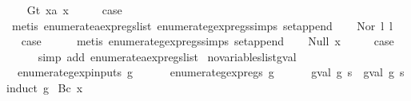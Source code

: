 \begin{isabellebody}
\isamarkupfalse%
\isanewline
\ \ \isamarkupfalse%
\ {\isacharparenleft}Gt\ x{}a\ x{}{\isacharparenright}\isanewline
\ \ \isamarkupfalse%
\ \isamarkupfalse%
\ {\isacharquery}case\isanewline
\ \ \ \ \isamarkupfalse%
\ {\isacharparenleft}metis\ enumerate{\isacharunderscore}aexp{\isacharunderscore}regs{\isacharunderscore}list\ enumerate{\isacharunderscore}gexp{\isacharunderscore}regs{\isachardot}simps{\isacharparenleft}{}{\isacharparenright}\ set{\isacharunderscore}append{\isacharparenright}\isanewline
{}\isamarkupfalse%
\isanewline
\ \ \isamarkupfalse%
\ {\isacharparenleft}Nor\ l{}\ l{}{\isacharparenright}\isanewline
\ \ \isamarkupfalse%
\ \isamarkupfalse%
\ {\isacharquery}case\isanewline
\ \ \ \ \isamarkupfalse%
\ {\isacharparenleft}metis\ enumerate{\isacharunderscore}gexp{\isacharunderscore}regs{\isachardot}simps{\isacharparenleft}{}{\isacharparenright}\ set{\isacharunderscore}append{\isacharparenright}\isanewline
{}\isamarkupfalse%
\isanewline
\ \ \isamarkupfalse%
\ {\isacharparenleft}Null\ x{\isacharparenright}\isanewline
\ \ \isamarkupfalse%
\ \isamarkupfalse%
\ {\isacharquery}case\isanewline
\ \ \ \ \isamarkupfalse%
\ {\isacharparenleft}simp\ add{\isacharcolon}\ enumerate{\isacharunderscore}aexp{\isacharunderscore}regs{\isacharunderscore}list{\isacharparenright}\isanewline
{}\isamarkupfalse%
%
\endisatagproof
{\isafoldproof}%
%
\isadelimproof
\isanewline
%
\endisadelimproof
\isanewline
{}\isamarkupfalse%
\ no{\isacharunderscore}variables{\isacharunderscore}list{\isacharunderscore}gval{\isacharcolon}\isanewline
\ \ {\isachardoublequoteopen}enumerate{\isacharunderscore}gexp{\isacharunderscore}inputs\ g\ {\isacharequal}\ {\isacharbraceleft}{\isacharbraceright}\ {\isasymLongrightarrow}\isanewline
\ \ \ enumerate{\isacharunderscore}gexp{\isacharunderscore}regs\ g\ {\isacharequal}\ {\isacharbraceleft}{\isacharbraceright}\ {\isasymLongrightarrow}\isanewline
\ \ \ gval\ g\ s\ {\isacharequal}\ gval\ g\ s{\isacharprime}{\isachardoublequoteclose}\isanewline
%
\isadelimproof
%
\endisadelimproof
%
\isatagproof
{}\isamarkupfalse%
{\isacharparenleft}induct\ g{\isacharparenright}\isanewline
{}\isamarkupfalse%
\ {\isacharparenleft}Bc\ x{\isacharparenright}\isanewline
\ \ \isamarkupfalse%

\end{isabellebody}
